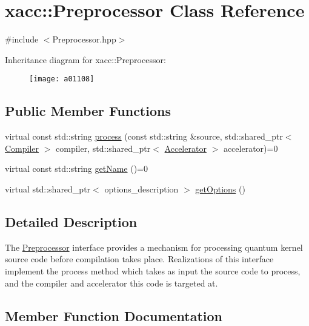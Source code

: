 \hypertarget{a01108}{}\section{xacc\+:\+:Preprocessor Class Reference}
\label{a01108}


{\ttfamily \#include $<$Preprocessor.\+hpp$>$}

Inheritance diagram for xacc\+:\+:Preprocessor\+:\begin{figure}[H]
\begin{center}
\leavevmode
\texttt{[image: a01108]}
\end{center}
\end{figure}
\subsection*{Public Member Functions}
\begin{DoxyCompactItemize}
\item 
virtual const std\+::string \hyperlink{a01108_ae59b5a2963f8bcc84b590a83f4749e19}{process} (const std\+::string \&source, std\+::shared\+\_\+ptr$<$ \hyperlink{a01100}{Compiler} $>$ compiler, std\+::shared\+\_\+ptr$<$ \hyperlink{a01084}{Accelerator} $>$ accelerator)=0
\item 
virtual const std\+::string \hyperlink{a01108_a36671f4c062d61e230306edc404774cd}{get\+Name} ()=0
\item 
virtual std\+::shared\+\_\+ptr$<$ options\+\_\+description $>$ \hyperlink{a01108_a96f5600ea47628b66917c7b90250e7f1}{get\+Options} ()
\end{DoxyCompactItemize}


\subsection{Detailed Description}
The \hyperlink{a01108}{Preprocessor} interface provides a mechanism for processing quantum kernel source code before compilation takes place. Realizations of this interface implement the process method which takes as input the source code to process, and the compiler and accelerator this code is targeted at. 

\subsection{Member Function Documentation}
\mbox{\label{a01108_a36671f4c062d61e230306edc404774cd}} 
